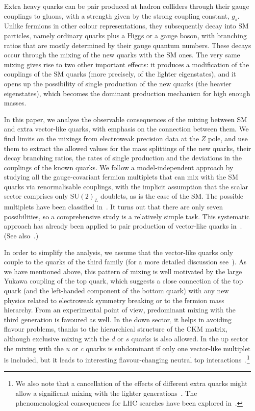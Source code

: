 \documentclass[12pt,a4paper]{article}
\begin{document}
Extra heavy quarks can be pair produced at hadron colliders through their gauge couplings to gluons, with a strength given by the strong coupling constant, $g_s$. Unlike fermions in other colour representations, they subsequently decay into SM particles, namely ordinary quarks plus a Higgs or a gauge boson, with branching ratios that are mostly determined by their gauge quantum numbers. These decays occur through the mixing of the new quarks with the SM ones. The very same mixing gives rise to two other important effects: it produces a modification of the couplings of the SM quarks (more precisely, of the lighter eigenstates), and it opens up the possibility of single production of the new quarks (the heavier eigenstates), which becomes the dominant production mechanism for high enough masses.

In this paper, we analyse the observable consequences of the mixing between SM and extra vector-like quarks, with emphasis on the connection between them. We find limits on the mixings from electroweak precision data at the $Z$ pole, and use them to extract the allowed values for the mass splittings of the new quarks, their decay branching ratios, the rates of single production and the deviations in the couplings of the known quarks. We follow a model-independent approach by studying all the gauge-covariant fermion multiplets that can mix with the SM quarks via renormalisable couplings, with the implicit assumption that the scalar sector comprises only $\text{SU}(2)_L$ doublets, as is the case of the SM. The possible multiplets have been classified in~\cite{delAguila:2000aa}. It turns out that there are only seven possibilities, so a comprehensive study is a relatively simple task. This systematic approach has already been applied to pair production of vector-like quarks in~\cite{AguilarSaavedra:2009es}. (See also~\cite{AguilarSaavedra:2005pv,AguilarSaavedra:2006gv,AguilarSaavedra:2006gw,Azatov:2012rj,Harigaya:2012ir}.)

In order to simplify the analysis, we assume that the vector-like quarks only couple to the quarks of the third family (for a more detailed discussion see~\cite{Aguilar-Saavedra:2013wba}). As we have mentioned above, this pattern of mixing is well motivated by the large Yukawa coupling of the top quark, which suggests a close connection of the top quark (and the left-handed component of the bottom quark) with any new physics related to electroweak symmetry breaking or to the fermion mass hierarchy. From an experimental point of view, predominant mixing with the third generation is favoured as well. In the down sector, it helps in avoiding flavour problems, thanks to the hierarchical structure of the CKM matrix, although exclusive mixing with the $d$ or $s$ quarks is also allowed. In the up sector the mixing with the $u$ or $c$ quarks is subdominant if only one vector-like multiplet is included, but it leads to interesting flavour-changing neutral top interactions~\cite{delAguila:1998tp}.\footnote{We also note that a cancellation of the effects of different extra quarks might allow a significant mixing with the lighter generations~\cite{Atre:2008iu}. The phenomenological consequences for LHC searches have been explored in~\cite{Atre:2011ae}.}
\end{document}
